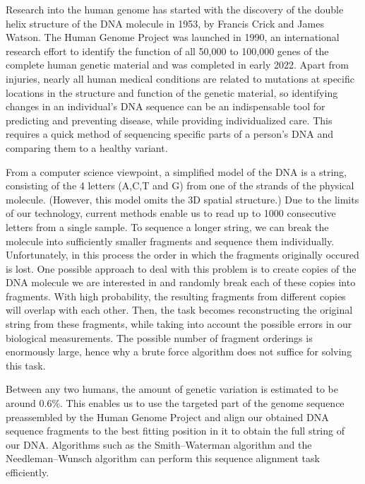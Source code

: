 Research into the human genome has started with the discovery of the double helix structure of the DNA molecule in 1953, by Francis Crick and James Watson. The Human Genome Project\cite{CollinsHumanGenome1995} was launched in 1990, an international research effort to identify the function of all 50,000 to 100,000 genes of the complete human genetic material and was completed in early 2022\cite{zahn_filling_2022}. Apart from injuries, nearly all human medical conditions are related to mutations at specific locations in the structure and function of the genetic material\cite{CollinsHumanGenome1995}, so identifying changes in an individual's DNA sequence can be an indispensable tool for predicting and preventing disease, while providing individualized care. This requires a quick method of sequencing specific parts of a person's DNA and comparing them to a healthy variant.

From a computer science viewpoint, a simplified model of the DNA is a string, consisting of the 4 letters (A,C,T and G) from one of the strands of the physical molecule. (However, this model omits the 3D spatial structure.) Due to the limits of our technology, current methods enable us to read up to 1000 consecutive letters from a single sample. To sequence a longer string, we can break the molecule into sufficiently smaller fragments and sequence them individually. Unfortunately, in this process the order in which the fragments originally occured is lost. One possible approach to deal with this problem is to create copies of the DNA molecule we are interested in and randomly break each of these copies into fragments. With high probability, the resulting fragments from different copies will overlap with each other. Then, the task becomes reconstructing the original string from these fragments, while taking into account the possible errors in our biological measurements. The possible number of fragment orderings is enormously large, hence why a brute force algorithm does not suffice for solving this task.\cite{CollinsHumanGenome1995}

Between any two humans, the amount of genetic variation is estimated to be around 0.6\%\cite{the_1000_genomes_project_consortium_global_2015}. This enables us to use the targeted part of the genome sequence preassembled by the Human Genome Project and align our obtained DNA sequence fragments to the best fitting position in it to obtain the full string of our DNA. Algorithms such as the Smith–Waterman algorithm and the Needleman–Wunsch algorithm can perform this sequence alignment task efficiently.

